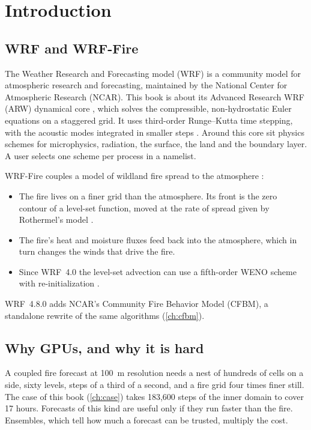 \chapter{Introduction}\label{ch:intro}

\section{WRF and WRF-Fire}

The Weather Research and Forecasting model (WRF) is a community model for atmospheric research and forecasting,
maintained by the National Center for Atmospheric Research (NCAR). This book is about its Advanced Research WRF
(ARW) dynamical core \citep{skamarock2019}, which solves the compressible, non-hydrostatic Euler equations on a
staggered grid. It uses third-order Runge--Kutta time stepping, with the acoustic modes integrated in smaller steps
\citep{wicker2002,klemp2007}. Around this core sit physics schemes for microphysics, radiation, the surface, the
land and the boundary layer. A user selects one scheme per process in a namelist.

WRF-Fire couples a model of wildland fire spread to the atmosphere \citep{coen2013,mandel2011}:
\begin{itemize}
  \item The fire lives on a finer grid than the atmosphere. Its front is the zero contour of a level-set function,
    moved at the rate of spread given by Rothermel's model \citep{rothermel1972}.
  \item The fire's heat and moisture fluxes feed back into the atmosphere, which in turn changes the winds that
    drive the fire.
  \item Since WRF~4.0 the level-set advection can use a fifth-order WENO scheme with re-initialization
    \citep{munozesparza2018}.
\end{itemize}

WRF~4.8.0 adds NCAR's Community Fire Behavior Model (CFBM), a standalone rewrite of the same algorithms
(\cref{ch:cfbm}).

\section{Why GPUs, and why it is hard}

A coupled fire forecast at 100~m resolution needs a nest of hundreds of cells on a side, sixty levels, steps of a
third of a second, and a fire grid four times finer still. The case of this book (\cref{ch:case}) takes 183{,}600
steps of the inner domain to cover 17 hours. Forecasts of this kind are useful only if they run faster than the
fire. Ensembles, which tell how much a forecast can be trusted, multiply the cost.

